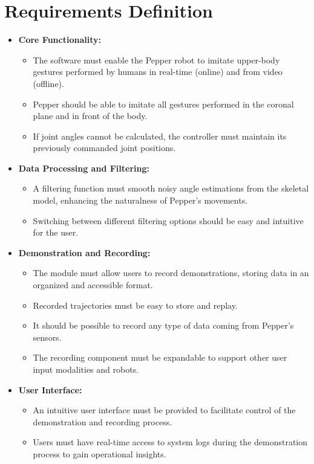 \documentclass{CSSRforAfrica}
\begin{document}
\section{Requirements Definition}
\begin{itemize}
    \item \textbf{Core Functionality:}
    \begin{itemize}
        \item The software must enable the Pepper robot to imitate upper-body gestures performed by humans in real-time (online) and from video (offline).
        \item Pepper should be able to imitate all gestures performed in the coronal plane and in front of the body.
        \item If joint angles cannot be calculated, the controller must maintain its previously commanded joint positions.
    \end{itemize}
    
    \item \textbf{Data Processing and Filtering:}
    \begin{itemize}
        \item A filtering function must smooth noisy angle estimations from the skeletal model, enhancing the naturalness of Pepper's movements.
        \item Switching between different filtering options should be easy and intuitive for the user.
    \end{itemize}
    
    \item \textbf{Demonstration and Recording:}
    \begin{itemize}
        \item The module must allow users to record demonstrations, storing data in an organized and accessible format.
        \item Recorded trajectories must be easy to store and replay.
        \item It should be possible to record any type of data coming from Pepper's sensors.
        \item The recording component must be expandable to support other user input modalities and robots.
    \end{itemize}
    
    \item \textbf{User Interface:}
    \begin{itemize}
        \item An intuitive user interface must be provided to facilitate control of the demonstration and recording process.
        \item Users must have real-time access to system logs during the demonstration process to gain operational insights.
    \end{itemize}
\end{itemize}
\end{document}
